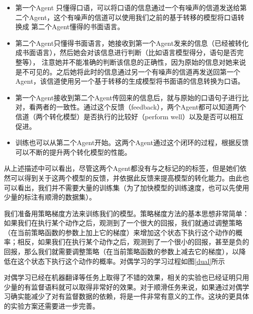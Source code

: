 \begin{itemize}
	\item 第一个Agent 只懂得口语，可以将口语的信息通过一个有噪声的信道发送给第二个Agent，这个有噪声的信道可以使用我们之前的基于转移的模型将口语转换成
	第二个Agent懂得的书面语言。
	\item 第二个Agent只懂得书面语言，她接收到第一个Agent发来的信息（已经被转化成书面语言），然后她会对该信息进行判断（比如语言模型得分，语句是否完整等），
	注意她并不能准确的判断该信息的正确性，因为原始的信息对她来说是不可见的。之后她将此时的信息通过另一个有噪声的信道再发送回第一个Agent，该信道使用另一个基于转移的生成模型将书面语的信息转换为口语。
	\item 第一个Agent接收到第二个Agent传回来的信息后，就与原始的口语句子进行比对，看两者的一致性。通过这个反馈（feedback），两个Agent都可以知道两个信道（两个转化模型）是否执行的比较好（perform well）以及是否可以相互促进。
	\item 训练也可以从第二个Agent开始。这两个Agent通过这个闭环的过程，根据反馈可以不断的提升两个转化模型的性能。
\end{itemize}
从上述描述中可以看出，尽管这两个Agent都没有与之标记的的标签，但是她们依然可以得到关于这两个模型的反馈，并依据此反馈来提高模型的转化能力。由此也可以看出，我们并不需要大量的训练集（为了加快模型的训练速度，也可以先使用少量的标注有顺滑的数据集）。

我们准备用策略梯度方法来训练我们的模型。策略梯度方法的基本思想非常简单：如果我们在执行某个动作之后，观测到了一个很大的回报，我们就通过调整策略（在当前策略函数的参数上加上它的梯度）来增加这个状态下执行这个动作的概率；相反，如果我们在执行某个动作之后，观测到了一个很小的回报，甚至是负的回报，那么我们就需要调整策略（在当前策略函数的参数上减去它的梯度），以降低在这个状态下执行这个动作的概率。对偶学习的学习过程如图\ref{dual}所示


对偶学习已经在机器翻译等任务上取得了不错的效果，相关的实验也已经证明只用少量的有监督语料就可以取得非常好的效果。对于顺滑任务来说，如果通过对偶学习确实能减少了对有监督数据的依赖，将是一件非常有意义的工作。这块的更具体的实验方案还需要进一步完善。

